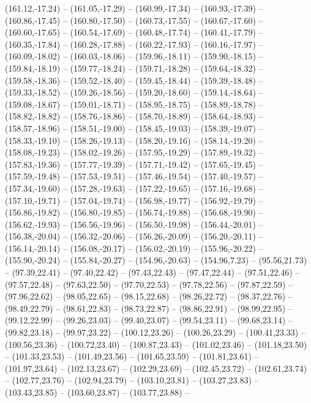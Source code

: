 {  (161.12,-17.24) -- (161.05,-17.29) -- (160.99,-17.34) -- (160.93,-17.39) -- (160.86,-17.45) -- (160.80,-17.50) -- (160.73,-17.55) --
  (160.67,-17.60) -- (160.60,-17.65) -- (160.54,-17.69) -- (160.48,-17.74) -- (160.41,-17.79) -- (160.35,-17.84) -- (160.28,-17.88) --
  (160.22,-17.93) -- (160.16,-17.97) -- (160.09,-18.02) -- (160.03,-18.06) -- (159.96,-18.11) -- (159.90,-18.15) -- (159.84,-18.19) --
  (159.77,-18.24) -- (159.71,-18.28) -- (159.64,-18.32) -- (159.58,-18.36) -- (159.52,-18.40) -- (159.45,-18.44) -- (159.39,-18.48) --
  (159.33,-18.52) -- (159.26,-18.56) -- (159.20,-18.60) -- (159.14,-18.64) -- (159.08,-18.67) -- (159.01,-18.71) -- (158.95,-18.75) --
  (158.89,-18.78) -- (158.82,-18.82) -- (158.76,-18.86) -- (158.70,-18.89) -- (158.64,-18.93) -- (158.57,-18.96) -- (158.51,-19.00) --
  (158.45,-19.03) -- (158.39,-19.07) -- (158.33,-19.10) -- (158.26,-19.13) -- (158.20,-19.16) -- (158.14,-19.20) -- (158.08,-19.23) --
  (158.02,-19.26) -- (157.95,-19.29) -- (157.89,-19.32) -- (157.83,-19.36) -- (157.77,-19.39) -- (157.71,-19.42) -- (157.65,-19.45) --
  (157.59,-19.48) -- (157.53,-19.51) -- (157.46,-19.54) -- (157.40,-19.57) -- (157.34,-19.60) -- (157.28,-19.63) -- (157.22,-19.65) --
  (157.16,-19.68) -- (157.10,-19.71) -- (157.04,-19.74) -- (156.98,-19.77) -- (156.92,-19.79) -- (156.86,-19.82) -- (156.80,-19.85) --
  (156.74,-19.88) -- (156.68,-19.90) -- (156.62,-19.93) -- (156.56,-19.96) -- (156.50,-19.98) -- (156.44,-20.01) -- (156.38,-20.04) --
  (156.32,-20.06) -- (156.26,-20.09) -- (156.20,-20.11) -- (156.14,-20.14) -- (156.08,-20.17) -- (156.02,-20.19) -- (155.96,-20.22) --
  (155.90,-20.24) -- (155.84,-20.27) -- (154.96,-20.63) -- (154.96,7.23) -- (95.56,21.73) -- (97.39,22.41) -- (97.40,22.42) --
  (97.43,22.43) -- (97.47,22.44) -- (97.51,22.46) -- (97.57,22.48) -- (97.63,22.50) -- (97.70,22.53) -- (97.78,22.56) --
  (97.87,22.59) -- (97.96,22.62) -- (98.05,22.65) -- (98.15,22.68) -- (98.26,22.72) -- (98.37,22.76) -- (98.49,22.79) --
  (98.61,22.83) -- (98.73,22.87) -- (98.86,22.91) -- (98.99,22.95) -- (99.12,22.99) -- (99.26,23.03) -- (99.40,23.07) --
  (99.54,23.11) -- (99.68,23.14) -- (99.82,23.18) -- (99.97,23.22) -- (100.12,23.26) -- (100.26,23.29) -- (100.41,23.33) --
  (100.56,23.36) -- (100.72,23.40) -- (100.87,23.43) -- (101.02,23.46) -- (101.18,23.50) -- (101.33,23.53) -- (101.49,23.56) --
  (101.65,23.59) -- (101.81,23.61) -- (101.97,23.64) -- (102.13,23.67) -- (102.29,23.69) -- (102.45,23.72) -- (102.61,23.74) --
  (102.77,23.76) -- (102.94,23.79) -- (103.10,23.81) -- (103.27,23.83) -- (103.43,23.85) -- (103.60,23.87) -- (103.77,23.88) --
}
